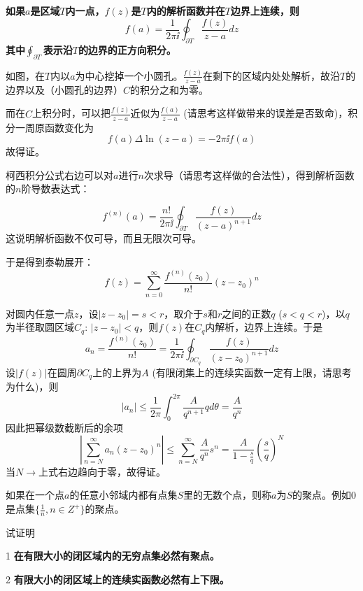\documentclass[CJK]{beamer}
\begin{document}
\begin{frame}
  \bch
      {\bf \blue 如果$a$是区域$T$内一点，$f(z)$是$T$内的解析函数并在$T$边界上连续，则
        $$ f(a) = \frac{1}{2\pi \ii}\oint_{\partial T} \frac{f(z)}{z-a} dz $$
        其中$\oint_{\partial T}$表示沿$T$的边界的正方向积分。}

      \emini
      如图，在$T$内以$a$为中心挖掉一个小圆孔。$\frac{f(z)}{z-a}$在剩下的区域内处处解析，故沿$T$的边界以及（小圆孔的边界）$C$的积分之和为零。

      而在$C$上积分时，可以把$\frac{f(z)}{z-a}$近似为$\frac{f(a)}{z-a}$ (请思考这样做带来的误差是否致命)，积分一周原函数变化为
      $$f(a)\Delta\ln(z-a)  = -2\pi \ii f(a)$$
      故得证。
      \emini
  \ech
\end{frame}

\begin{frame}
  \bch
  柯西积分公式右边可以对$a$进行$n$次求导（请思考这样做的合法性），得到解析函数的$n$阶导数表达式：

  {\blue
        $$f^{(n)}(a) = \frac{n!}{2\pi \ii}\oint_{\partial T} \frac{f(z)}{(z-a)^{n+1}} dz$$    
  }
  这说明解析函数不仅可导，而且无限次可导。

  于是得到泰勒展开：
  $$f(z) = \sum_{n=0}^\infty \frac{f^{(n)}(z_0)}{n!} (z-z_0)^n$$
  \ech
\end{frame}


\begin{frame}
  \bch
 对圆内任意一点$z$，设$|z-z_0|=s<r$，取介于$s$和$r$之间的正数$q$ ($s<q<r$)，以$q$为半径取圆区域$C_q$: $|z-z_0|<q$，则$f(z)$在$C_q$内解析，边界上连续。于是
  $$ a_n = \frac{f^{(n)}(z_0)}{n!} = \frac{1}{2\pi \ii}\oint_{\partial C_q} \frac{f(z)}{(z-z_0)^{n+1}}dz $$
  设$|f(z)|$在圆周$\partial C_q$上的上界为$A$ (有限闭集上的连续实函数一定有上限，请思考为什么)，则
  $$ |a_n| \le \frac{1}{2\pi} \int_0^{2\pi} \frac{A}{q^{n+1}} qd\theta = \frac{A}{q^n} $$
  因此把幂级数截断后的余项
  $$ \left\vert \sum_{n=N}^\infty a_n (z-z_0)^n \right\vert \le \sum_{n=N}^\infty \frac{A}{q^n}s^n =\frac{A}{1-\frac{s}{q}} \left(\frac{s}{q}\right)^N$$
  当$N\rightarrow$上式右边趋向于零，故得证。
  \ech
\end{frame}


\begin{frame}
  \bch
  如果在一个点$a$的任意小邻域内都有点集$S$里的无数个点，则称$a$为$S$的聚点。例如$0$是点集$\{ \frac{1}{n}, n\in Z^+\}$的聚点。


  试证明
  \bitem
\item[1]{\bf 在有限大小的闭区域内的无穷点集必然有聚点。}
\item[2]{\bf 有限大小的闭区域上的连续实函数必然有上下限。}
  \eitem
  \ech
\end{frame}
\end{document}

